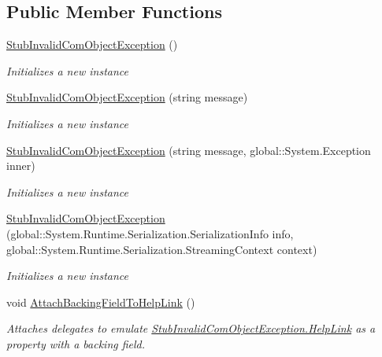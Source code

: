 \subsection*{Public Member Functions}
\begin{DoxyCompactItemize}
\item 
\hyperlink{class_system_1_1_runtime_1_1_interop_services_1_1_fakes_1_1_stub_invalid_com_object_exception_a549da7cde74aff95e50a618b93c5bcdb}{Stub\-Invalid\-Com\-Object\-Exception} ()
\begin{DoxyCompactList}\small\item\em Initializes a new instance\end{DoxyCompactList}\item 
\hyperlink{class_system_1_1_runtime_1_1_interop_services_1_1_fakes_1_1_stub_invalid_com_object_exception_a87df7be879e62ec294118670b83a1a51}{Stub\-Invalid\-Com\-Object\-Exception} (string message)
\begin{DoxyCompactList}\small\item\em Initializes a new instance\end{DoxyCompactList}\item 
\hyperlink{class_system_1_1_runtime_1_1_interop_services_1_1_fakes_1_1_stub_invalid_com_object_exception_a43128c72365d7277e1a6684ef7c8d6f4}{Stub\-Invalid\-Com\-Object\-Exception} (string message, global\-::\-System.\-Exception inner)
\begin{DoxyCompactList}\small\item\em Initializes a new instance\end{DoxyCompactList}\item 
\hyperlink{class_system_1_1_runtime_1_1_interop_services_1_1_fakes_1_1_stub_invalid_com_object_exception_ae22a7c1b304029fca722d879db4e1046}{Stub\-Invalid\-Com\-Object\-Exception} (global\-::\-System.\-Runtime.\-Serialization.\-Serialization\-Info info, global\-::\-System.\-Runtime.\-Serialization.\-Streaming\-Context context)
\begin{DoxyCompactList}\small\item\em Initializes a new instance\end{DoxyCompactList}\item 
void \hyperlink{class_system_1_1_runtime_1_1_interop_services_1_1_fakes_1_1_stub_invalid_com_object_exception_a25772f8642163bd8a3951bd36e35bd5e}{Attach\-Backing\-Field\-To\-Help\-Link} ()
\begin{DoxyCompactList}\small\item\em Attaches delegates to emulate \hyperlink{class_system_1_1_runtime_1_1_interop_services_1_1_fakes_1_1_stub_invalid_com_object_exception_a8492dfb18a4abafd969a29eefd13ea4e}{Stub\-Invalid\-Com\-Object\-Exception.\-Help\-Link} as a property with a backing field.\end{DoxyCompactList}\item 

\end{DoxyCompactItemize}
